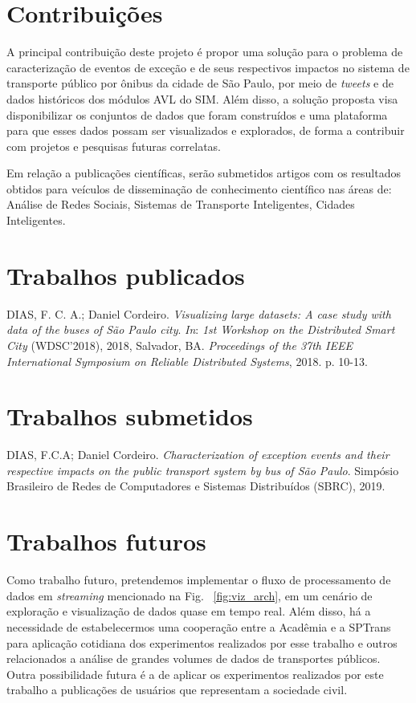\documentclass[
	12pt,				%
	oneside,			%
	a4paper,			%
	english,			%
	brazil				%
	]{abntex2ppgsi}
\begin{document}
{{\section{Contribuições}

A principal contribuição deste projeto é propor uma solução para o problema de caracterização de eventos de exceção e de seus respectivos impactos no sistema de transporte público por ônibus da cidade de São Paulo, por meio de \textit{tweets} e de dados históricos dos módulos AVL do SIM. Além disso, a solução proposta visa disponibilizar os conjuntos de dados que foram construídos e uma plataforma para que esses dados possam ser visualizados e explorados, de forma a contribuir com projetos e pesquisas futuras correlatas.

Em relação a publicações científicas, serão submetidos artigos com os resultados obtidos para veículos de disseminação de conhecimento científico nas áreas de: Análise de Redes Sociais, Sistemas de Transporte Inteligentes, Cidades Inteligentes.

\section{Trabalhos publicados}

DIAS, F. C. A.; Daniel Cordeiro. \textit{Visualizing large datasets: A case study with data of the buses of São Paulo city}. \textit{In}: \textit{1st Workshop on the Distributed Smart City} (WDSC'2018), 2018, Salvador, BA. \textit{Proceedings of the 37th IEEE International Symposium on Reliable Distributed Systems}, 2018. p. 10-13.

\section{Trabalhos submetidos}

DIAS, F.C.A; Daniel Cordeiro. \textit{Characterization of exception events and their respective impacts on the public transport system by bus of São Paulo}. Simpósio Brasileiro de Redes de Computadores e Sistemas Distribuídos (SBRC), 2019.

\section{Trabalhos futuros}
Como trabalho futuro, pretendemos implementar o fluxo de processamento de dados em \textit{streaming} mencionado na Fig. ~\ref{fig:viz_arch}, em um cenário de exploração e visualização de dados quase em tempo real.  Além disso, há a necessidade de estabelecermos uma cooperação entre a Acadêmia e a SPTrans para aplicação cotidiana dos experimentos realizados por esse trabalho e outros relacionados a análise de grandes volumes de dados de transportes públicos. Outra possibilidade futura é a de aplicar os experimentos realizados por este trabalho a publicações de usuários que representam a sociedade civil.

}}
\end{document}
